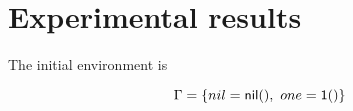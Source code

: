 \section{Experimental results}\label{sec:experimental}

The initial environment is

\[
    \Gamma = \{ nil = \textsf{nil}(),\ one = \textsf{1}() \}
\]

\newcommand{\retTrue}{\matchreturn{\textsf{True}}}
\newcommand{\retFalse}{\matchreturn{\textsf{False}}}
\newcommand{\isShortBody}{\matchalt{\matchpat{(x : y : ys)}{\retFalse}}{\matchpat{ys}{\retTrue}}}
\newcommand{\isShortPMC}{\ensuremath{\isShort}}
\newcommand{\isShort}{\textsf{isShort}}
\newcommand{\listOne}{(one : nil)}
\newcommand{\single}{\abstr{(\matchpat{x}{\matchreturn{(x : nil)}})}}
\newcommand{\retSingle}{\matchreturn{(x : nil)}}
\newcommand{\matchNilList}{\matcharg{nil}{\matchpat{(y : ys)}{\retFalse}}}


